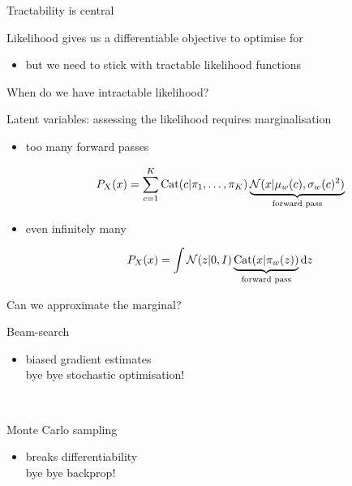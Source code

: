 \documentclass[14pt]{beamer}
\begin{document}
\begin{frame}{Tractability is central}

Likelihood gives us a differentiable objective to optimise for
\begin{itemize}
	\item but we need to stick with \alert{tractable} likelihood functions
\end{itemize}




\end{frame}

\begin{frame}{When do we have intractable likelihood?}

Latent variables: assessing the likelihood requires marginalisation
\begin{itemize}
	\item too many forward passes
	\begin{small}
	\begin{equation*}
	P_X(x) = \sum_{c=1}^K \operatorname{Cat}(c|\pi_1, \ldots, \pi_K) \underbrace{\mathcal N(x|\mu_w(c), \sigma_w(c)^2)}_{\text{forward pass}}
	\end{equation*}
	\end{small}
	\pause
	\item even infinitely many
	\begin{small}
	\begin{equation*}
	P_X(x) = \int \mathcal N(z|0, I) \underbrace{\operatorname{Cat}(x|\pi_w(z))}_{\text{forward pass}} \mathrm{d}z
	\end{equation*}
	\end{small}
\end{itemize}

\end{frame}


\begin{frame}{Can we approximate the marginal?}

Beam-search %
\begin{itemize}
	\item \alert{biased gradient estimates}\\
	bye bye stochastic optimisation!
\end{itemize}

~\pause

Monte Carlo sampling
\begin{itemize}
	\item \alert{breaks differentiability}\\
	bye bye backprop!
\end{itemize}

\end{frame}
\end{document}
